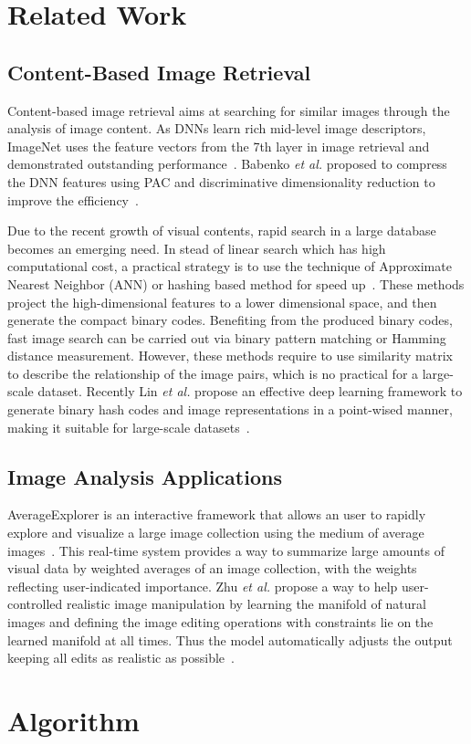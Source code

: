 \section{Related Work}
\subsection{Content-Based Image Retrieval}
Content-based image retrieval aims at searching for similar images
through the analysis of image content. As DNNs learn rich mid-level
image descriptors, ImageNet uses the feature vectors from the 7th
layer in image retrieval and demonstrated outstanding
performance~\cite{krizhevsky2012imagenet}. Babenko \textit{et al.}
proposed to compress the DNN features using PAC and discriminative
dimensionality reduction to improve the efficiency~\cite{babenko2014neural}.

Due to the recent growth of visual contents, rapid search in a large
database becomes an emerging need. In stead of linear search which has
high computational cost, a practical strategy is to use the technique
of Approximate Nearest Neighbor (ANN) or hashing based method for
speed up~\cite{gionis1999similarity,weiss2009spectral,kulis2009learning,
norouzi2011minimal,liu2012supervised,xia2014supervised}. These methods
project the high-dimensional features to a lower dimensional space, and
then generate the compact binary codes. Benefiting from the produced
binary codes, fast image search can be carried out via binary pattern
matching or Hamming distance measurement. However, these methods require
to use similarity matrix to describe the relationship of the image pairs, which
is no practical for a large-scale dataset. Recently Lin \textit{et al.}
propose an effective deep learning framework to generate binary hash codes
and image representations in a point-wised manner, making it suitable
for large-scale datasets~\cite{lin2015deep}.

\subsection{Image Analysis Applications}
AverageExplorer is an interactive framework that allows an user to rapidly
explore and visualize a large image collection using the medium of average
images~\cite{zhu2014averageexplorer}. This real-time system provides a
way to summarize large amounts of visual data by weighted averages of
an image collection, with the weights reflecting user-indicated importance.
Zhu \textit{et al.} propose a way to help user-controlled realistic image
manipulation by learning the manifold of natural images and defining the
image editing operations with constraints lie on the learned manifold at
all times. Thus the model automatically adjusts the output keeping all edits
as realistic as possible~\cite{zhu2016generative}.

\section{Algorithm}
\label{sec:algo}
